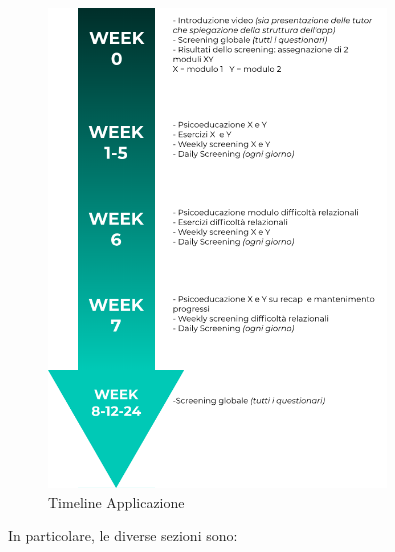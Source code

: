 \begin{figure}
\centering
\includegraphics[width=0.8\textwidth]{img/timeline_app}
\caption{Timeline Applicazione}
\label{fig:timeline_app}
\end{figure}

\newpage

In particolare, le diverse sezioni sono:

